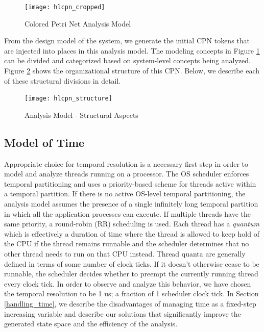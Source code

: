 \begin{figure}[h]
	\centering
	\texttt{[image: hlcpn\_cropped]}
	\caption{Colored Petri Net Analysis Model}
	\label{fig:hlcpn}
\end{figure}

From the design model of the system, we generate the initial CPN tokens that are injected into places in this analysis model. The modeling concepts in Figure \ref{fig:hlcpn} can be divided and categorized based on system-level concepts being analyzed. Figure \ref{fig:hlcpn_structure} shows the organizational structure of this CPN. Below, we describe each of these structural divisions in detail. 

\begin{figure}[h]
	\centering
	\texttt{[image: hlcpn\_structure]}
	\caption{Analysis Model - Structural Aspects}
	\label{fig:hlcpn_structure}
\end{figure}

\subsection{Model of Time}
\label{sec:model_of_time}

Appropriate choice for temporal resolution is a necessary first step in order to model and analyze threads running on a processor. The OS scheduler enforces temporal partitioning and uses a priority-based scheme for threads active within a temporal partition. If there is no active OS-level temporal partitioning, the analysis model assumes the presence of a single infinitely long temporal partition in which all the application processes can execute. If multiple threads have the same priority, a round-robin (RR) scheduling is used. Each thread has a \emph{quantum} which is effectively a duration of time where the thread is allowed to keep hold of the CPU if the thread remains runnable and the scheduler determines that no other thread needs to run on that CPU instead. Thread quanta are generally defined in terms of some number of clock ticks. If it doesn't otherwise cease to be runnable, the scheduler decides whether to preempt the currently running thread every clock tick. In order to observe and analyze this behavior, we have chosen the temporal resolution to be 1 us; a fraction of 1 scheduler clock tick. In Section \ref{handling_time}, we describe the disadvantages of managing time as a fixed-step increasing variable and describe our solutions that significantly improve the generated state space and the efficiency of the analysis. 

